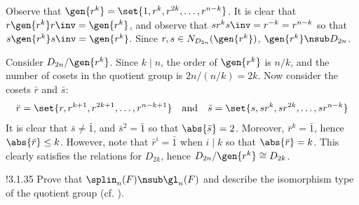 \begin{solenum}
    \item Observe that $\gen{r^k} = \set{1, r^k, r^{2k}, \ldots, r^{n - k}}$.
	It is clear that $r\gen{r^k}r\inv = \gen{r^k}$, and observe that $sr^ks\inv = r^{-k} = r^{n - k}$ so that $s\gen{r^k}s\inv = \gen{r^k}$.
	Since $r, s \in N_{D_{2n}}(\gen{r^k})$, $\gen{r^k} \nsub D_{2n}$.
    \item Consider $D_{2n}/\gen{r^k}$.
	Since $k \mid n$, the order of $\gen{r^k}$ is $n/k$, and the number of cosets in the quotient group is $2n/(n/k) = 2k$.
	Now consider the cosets $\bar r$ and $\bar s$:
    \[
    	\bar r = \set{r, r^{k + 1}, r^{2k + 1}, \ldots, r^{n - k + 1}} \quad \text{and} \quad \bar s = \set{s, sr^k, sr^{2k}, \ldots, sr^{n - k}}
    \]
    It is clear that $\bar s \neq \bar 1$, and $\bar s^2 = \bar 1$ so that $\abs{\bar s} = 2$.
	Moreover, $\bar r^k = \bar 1$, hence $\abs{\bar r} \leq k$.
	However, note that $\bar r^i = \bar 1$ when $i \mid k$ so that $\abs{\bar r} = k$.
	This clearly satisfies the relations for $D_{2k}$, hence $D_{2n}/\gen{r^k} \cong D_{2k}$. 
\end{solenum}

\begin{exercise}!{3.1.35} 
    Prove that $\splin_n(F) \nsub \gl_n(F)$ and describe the isomorphism type of the quotient group (cf. ).
\end{exercise}


